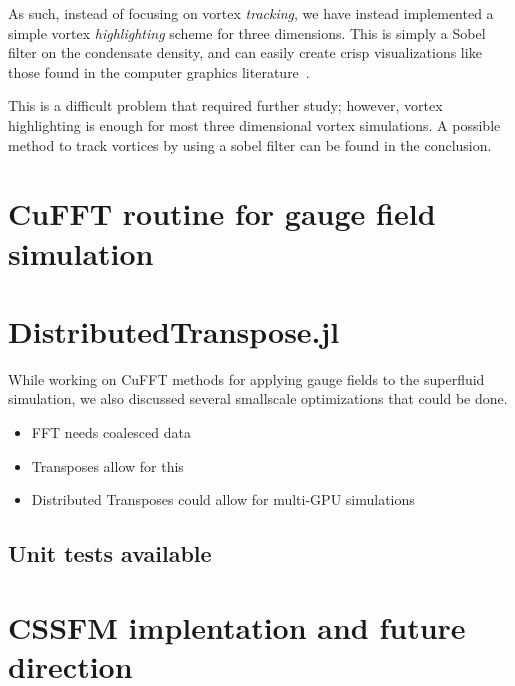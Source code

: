 As such, instead of focusing on vortex \textit{tracking}, we have instead implemented a simple vortex \textit{highlighting} scheme for three dimensions.
This is simply a Sobel filter on the condensate density, and can easily create crisp visualizations like those found in the computer graphics literature~\cite{guo2018}.


This is a difficult problem that required further study; however, vortex highlighting is enough for most three dimensional vortex simulations.
A possible method to track vortices by using a sobel filter can be found in the conclusion.

\section{CuFFT routine for gauge field simulation}

\section{DistributedTranspose.jl}
While working on CuFFT methods for applying gauge fields to the superfluid simulation, we also discussed several smallscale optimizations that could be done.

\begin{itemize}
\item{FFT needs coalesced data}
\item{Transposes allow for this}
\item{Distributed Transposes could allow for multi-GPU simulations}
\end{itemize}

\subsection{Unit tests available}

\section{CSSFM implentation and future direction}
